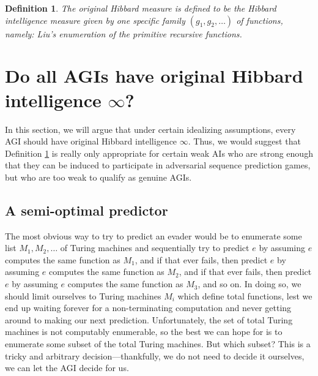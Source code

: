 \documentclass{article}
\newtheorem{definition}[theorem]{Definition}
\begin{document}
\begin{definition}
\label{classichibbardmeasuredefn}
    The \emph{original Hibbard measure} is defined to be the Hibbard intelligence
    measure given by one specific family $(g_1,g_2,\ldots)$ of functions, namely:
    Liu's \cite{liu1960enumeration} enumeration of the primitive recursive
    functions.
\end{definition}


\section{Do all AGIs have original Hibbard intelligence $\infty$?}
\label{trivialitysection}

In this section, we will argue that under certain idealizing
assumptions, every AGI should have original Hibbard intelligence $\infty$.
Thus, we would suggest that Definition \ref{classichibbardmeasuredefn} is really
only appropriate for certain weak AIs who are strong enough that they can be
induced to participate in adversarial sequence prediction games, but who are
too weak to qualify as genuine AGIs.


\subsection{A semi-optimal predictor}
\label{semioptimalpredictorsubsection}

The most obvious way to try to predict an evader would be to
enumerate some list $M_1,M_2,\ldots$ of Turing machines and
sequentially try to predict $e$ by assuming $e$ computes the same
function as $M_1$, and if that ever fails, then predict $e$ by
assuming $e$ computes the same function as $M_2$, and if that ever
fails, then predict $e$ by assuming $e$ computes the same function
as $M_3$, and so on. In doing so, we should limit ourselves
to Turing machines $M_i$ which define total functions, lest
we end up waiting forever for a non-terminating computation
and never getting around to making our next
prediction. Unfortunately, the set of total Turing machines is
not computably enumerable, so the best we can hope for is to enumerate
some subset of the total Turing machines. But which subset? This is
a tricky and arbitrary decision---thankfully, we do not need to
decide it ourselves, we can let the AGI decide for us.
\end{document}
